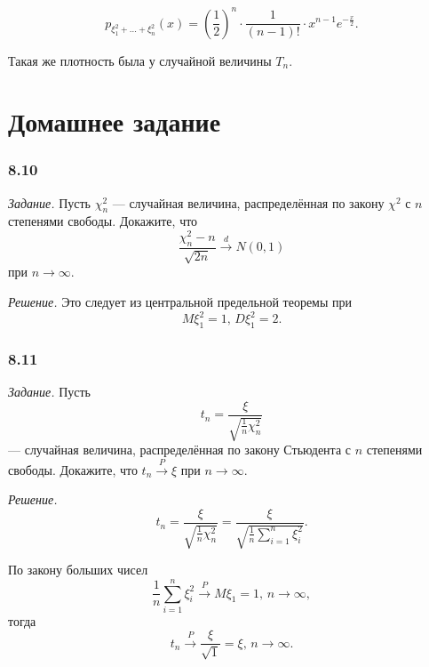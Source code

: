 $$p_{ \xi_1^2 + \dotsc + \xi_n^2} \left( x \right) =
  \left( \frac{1}{2} \right)^n \cdot \frac{1}{ \left( n - 1 \right)!} \cdot
  x^{n - 1} e^{- \frac{x}{2}}.$$

Такая же плотность была у случайной величины $T_n$.

\section*{Домашнее задание}

\subsubsection*{8.10}

\textit{Задание.}
Пусть $ \chi_n^2$ --- случайная величина,
распределённая по закону $ \chi^2$ с $n$ степенями свободы.
Докажите, что
$$ \frac{ \chi_n^2 - n}{ \sqrt{2n}} \overset{d}{ \rightarrow}
  N \left( 0, 1 \right) $$
при $n \to \infty $.

\textit{Решение.}
Это следует из центральной предельной теоремы при
$$M \xi_1^2 = 1, \,
  D \xi_1^2 = 2.$$


\subsubsection*{8.11}

\textit{Задание.} Пусть
$$t_n =
  \frac{ \xi }{ \sqrt{ \frac{1}{n} \chi_n^2}}$$
--- случайная величина, распределённая по закону Стьюдента с $n$ степенями свободы.
Докажите, что $t_n \overset{P}{ \rightarrow } \xi $ при $n \to \infty $.

\textit{Решение.}
$$t_n =
  \frac{ \xi }{ \sqrt{ \frac{1}{n} \chi_n^2}} =
  \frac{ \xi }{ \sqrt{ \frac{1}{n} \sum \limits_{i = 1}^n \xi_i^2}}.$$

По закону больших чисел
$$ \frac{1}{n} \sum \limits_{i = 1}^n  \xi_i^2 \overset{P}{ \rightarrow }
  M \xi_1 =
  1, \,
  n \to \infty,$$
тогда
$$t_n \overset{P}{ \rightarrow } \frac{ \xi }{ \sqrt{1}} = \xi, \,
  n \to \infty.$$
